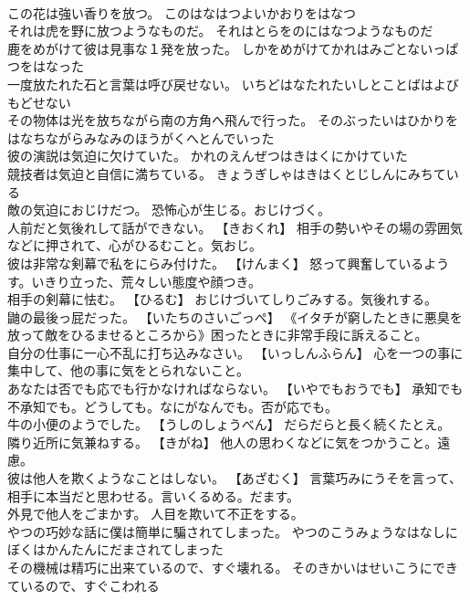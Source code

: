 \documentclass[8pt]{extreport}
\begin{document}
\begin{CJK}{UTF8}{min}
\\	この花は強い香りを放つ。	このはなはつよいかおりをはなつ 
\\	それは虎を野に放つようなものだ。	それはとらをのにはなつようなものだ 
\\	鹿をめがけて彼は見事な１発を放った。	しかをめがけてかれはみごとないっぱつをはなった 
\\	一度放たれた石と言葉は呼び戻せない。	いちどはなたれたいしとことばはよびもどせない 
\\	その物体は光を放ちながら南の方角へ飛んで行った。	そのぶったいはひかりをはなちながらみなみのほうがくへとんでいった 
\\	彼の演説は気迫に欠けていた。	かれのえんぜつはきはくにかけていた 
\\	競技者は気迫と自信に満ちている。	きょうぎしゃはきはくとじしんにみちている 
\\	敵の気迫におじけだつ。	恐怖心が生じる。おじけづく。
\\	人前だと気後れして話ができない。	【きおくれ】 相手の勢いやその場の雰囲気などに押されて、心がひるむこと。気おじ。
\\	彼は非常な剣幕で私をにらみ付けた。	【けんまく】 怒って興奮しているようす。いきり立った、荒々しい態度や顔つき。
\\	相手の剣幕に怯む。	【ひるむ】 おじけづいてしりごみする。気後れする。
\\	鼬の最後っ屁だった。	【いたちのさいごっぺ】 《イタチが窮したときに悪臭を放って敵をひるませるところから》困ったときに非常手段に訴えること。
\\	自分の仕事に一心不乱に打ち込みなさい。	【いっしんふらん】 心を一つの事に集中して、他の事に気をとられないこと。
\\	あなたは否でも応でも行かなければならない。	【いやでもおうでも】 承知でも不承知でも。どうしても。なにがなんでも。否が応でも。
\\	牛の小便のようでした。	【うしのしょうべん】 だらだらと長く続くたとえ。
\\	隣り近所に気兼ねする。	【きがね】 他人の思わくなどに気をつかうこと。遠慮。
\\	彼は他人を欺くようなことはしない。	【あざむく】 言葉巧みにうそを言って、相手に本当だと思わせる。言いくるめる。だます。
\\	外見で他人をごまかす。	人目を欺いて不正をする。
\\	やつの巧妙な話に僕は簡単に騙されてしまった。	やつのこうみょうなはなしにぼくはかんたんにだまされてしまった 
\\	その機械は精巧に出来ているので、すぐ壊れる。	そのきかいはせいこうにできているので、すぐこわれる 

\end{CJK}
\end{document}
